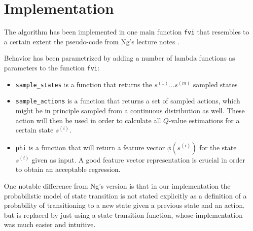 \documentclass[a4paper, 12pt]{article}
\begin{document}
\section*{Implementation} 
The algorithm has been implemented in one main function \texttt{fvi}
that resembles to a certain extent the pseudo-code
from Ng's lecture notes \cite{ng_lecture}.

Behavior has been parametrized by adding a number of lambda functions
as parameters to the function \texttt{fvi}:

\begin{itemize}
\item \texttt{sample\_states} is a function that returns the $s^{(1)}\ldots s^{(m)}$ sampled states
\item \texttt{sample\_actions} is a function that returns a set of sampled actions, which might be in principle sampled from a continuous distribution as well.
These action will then be used in order to calculate all $Q$-value
estimations for a certain state $s^{(i)}$.
\item \texttt{phi} is a function that will return a feature vector
$\phi(s^{(i)})$ for the state $s^{(i)}$ given as input.
A good feature vector representation is
crucial in order to obtain an acceptable regression.
\end{itemize}

One notable difference from Ng's version is that in our implementation
the probabilistic model of state transition is not stated explicitly
as a definition of a probability of transitioning to a new state 
given a previous state and an action, but is replaced by
just using a state transition function, whose implementation
was much easier and intuitive.
\end{document}
